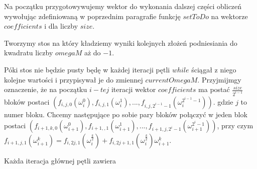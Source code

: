 \documentclass{article}
\begin{document}
Na początku przygotowywujemy wektor do wykonania dalszej części obliczeń wywołując zdefiniowaną w poprzednim paragrafie funkcję $setToDo$ na wektorze $coefficients$ i dla liczby $size$. 

Tworzymy stos na który kładziemy wyniki kolejnych złożeń podniesiania do kwadratu liczby $omegaM$ aż do $-1$.

Póki stos nie będzie pusty będę w każdej iteracji pętli $while$ ściągał z niego kolejne wartości i przypisywał je do zmiennej $currentOmegaM$.
Przyjmijmgy oznaczenie, że na początku $i-tej$ iteracji wektor $coefficients$ ma postać $\frac{size}{2^{i-1}}$ bloków postaci
$(f_{i,j,0}(\omega_i^0),f_{i,j,1}(\omega_i^1),...,f_{i,j,2^{i-1}-1}(\omega^{2^{i-1}-1}_i))$. gdzie $j$ to numer bloku. Chcemy następujące po sobie pary bloków połączyć w jeden blok postaci $(f_{i+1,k,0}(\omega_{i+1}^0),f_{i+1,,1}(\omega_{i+1}^1),...,f_{i+1,j,2^{i}-1}(\omega^{2^{i}-1}_{i+1}))$, przy czym $f_{i+1,j,1}(\omega_{i+1}^k) = f_{i,2j,1}(\omega_{i}^\frac{k}{2})+f_{i,2j+1,1}(\omega_{i}^{\frac{k}{2}})\omega_{i+1}^k$. 

Każda iteracja głównej pętli zawiera 



 
\end{document}
